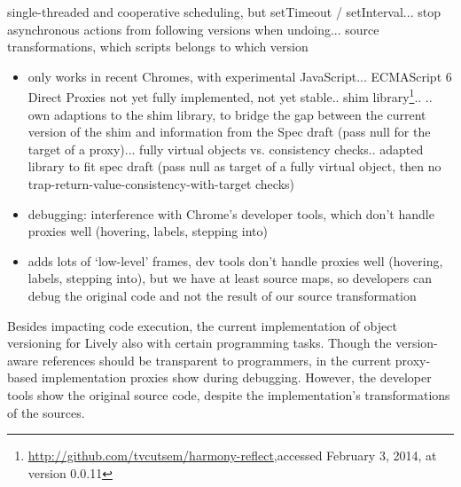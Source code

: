 

single-threaded and cooperative scheduling, but setTimeout / setInterval... stop asynchronous actions from following versions when undoing... source transformations, which scripts belongs to which version



\begin{itemize}
    \item only works in recent Chromes, with experimental JavaScript... ECMAScript 6 Direct Proxies not yet fully implemented, not yet stable.. shim library\footnote{\url{http://github.com/tvcutsem/harmony-reflect},\goodbreak accessed February 3, 2014, at version 0.0.11}..
.. own adaptions to the shim library, to bridge the gap between the current version of the shim and information from the Spec draft (pass null for the target of a proxy)... fully virtual objects vs. consistency checks.. adapted library to fit spec draft (pass null as target of a fully virtual object, then no trap-return-value-consistency-with-target checks)
\end{itemize}
    


\begin{itemize}
    \item debugging: interference with Chrome's developer tools, which don’t handle proxies well (hovering, labels, stepping into)
\end{itemize}



\begin{itemize}
    \item adds lots of ‘low-level’ frames, dev tools don’t handle proxies well (hovering, labels, stepping into), but we have at least source maps, so developers can debug the original code and not the result of our source transformation
\end{itemize}


Besides impacting code execution, the current implementation of object versioning for Lively also  with certain programming tasks.
Though the version-aware references should be transparent to programmers, in the current proxy-based implementation proxies show during debugging.
However, the developer tools show the original source code, despite the implementation's transformations of the sources.
